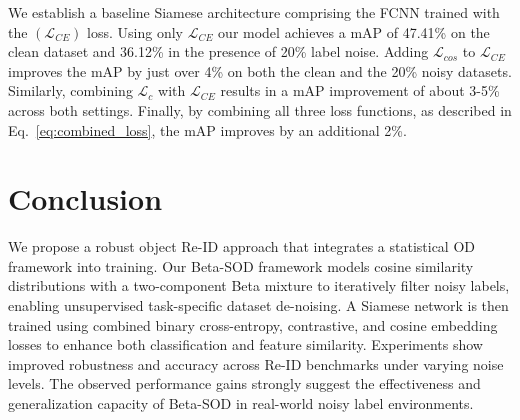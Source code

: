 \documentclass[lettersize,journal]{IEEEtran}
\begin{document}
We establish a baseline Siamese architecture comprising the FCNN trained with the $(\mathcal{L}_{CE})$ loss. Using only $\mathcal{L}_{CE}$ our model achieves a mAP of 47.41\% on the clean dataset and 36.12\% in the presence of 20\% label noise.
Adding $\mathcal{L}_{cos}$ to $\mathcal{L}_{CE}$ improves the mAP by just over 4\% on both the clean and the 20\% noisy datasets. Similarly, combining $\mathcal{L}_{c}$ with $\mathcal{L}_{CE}$ results in a mAP improvement of about 3-5\% across both settings. Finally, by combining all three loss functions, as described in Eq.~\ref{eq:combined_loss}, the mAP improves by an additional 2\%.


\begin{table}[t]
\caption{Loss Function Selection on CUHK03 Dataset with random noise level of 0\% and 20\% (5 runs average)}
{}
\label{table:ablation}
\end{table}


\section{Conclusion}
We propose a robust object Re-ID approach that integrates a statistical OD framework into training. Our Beta-SOD framework models cosine similarity distributions with a two-component Beta mixture to iteratively filter noisy labels, enabling unsupervised task-specific dataset de-noising. A Siamese network is then trained using combined binary cross-entropy, contrastive, and cosine embedding losses to enhance both classification and feature similarity. Experiments show improved robustness and accuracy across Re-ID benchmarks under varying noise levels. The observed performance gains strongly suggest the effectiveness and generalization capacity of Beta-SOD in real-world noisy label environments.
\end{document}
